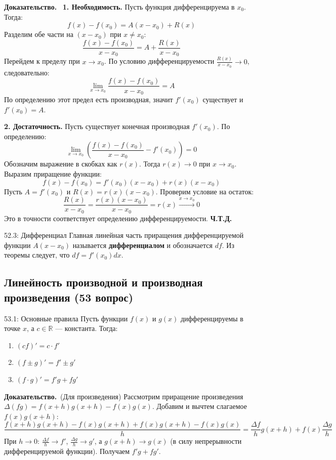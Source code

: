 \documentclass[a4paper,12pt]{article}
\newcommand{\myproof}{\textbf{Доказательство.}\ }
\begin{document}
	\vspace{0.5cm}
	\myproof
	\textbf{1. Необходимость.} Пусть функция дифференцируема в $x_0$. Тогда:
	$$ f(x) - f(x_0) = A(x - x_0) + R(x) $$
	Разделим обе части на $(x - x_0)$ при $x \neq x_0$:
	$$ \frac{f(x) - f(x_0)}{x - x_0} = A + \frac{R(x)}{x - x_0} $$
	Перейдем к пределу при $x \to x_0$. По условию дифференцируемости $\frac{R(x)}{x - x_0} \to 0$, следовательно:
	$$ \lim_{x \to x_0} \frac{f(x) - f(x_0)}{x - x_0} = A $$
	По определению этот предел есть производная, значит $f'(x_0)$ существует и $f'(x_0) = A$.
	
	\textbf{2. Достаточность.} Пусть существует конечная производная $f'(x_0)$. По определению:
	$$ \lim_{x \to x_0} \left( \frac{f(x) - f(x_0)}{x - x_0} - f'(x_0) \right) = 0 $$
	Обозначим выражение в скобках как $r(x)$. Тогда $r(x) \to 0$ при $x \to x_0$. Выразим приращение функции:
	$$ f(x) - f(x_0) = f'(x_0)(x - x_0) + r(x)(x - x_0) $$
	Пусть $A = f'(x_0)$ и $R(x) = r(x)(x - x_0)$. Проверим условие на остаток:
	$$ \frac{R(x)}{x - x_0} = \frac{r(x)(x - x_0)}{x - x_0} = r(x) \xrightarrow{x \to x_0} 0 $$
	Это в точности соответствует определению дифференцируемости. \textbf{Ч.Т.Д.}
	
	\vspace{0.5cm}
	\begin{notebook}{52.3: Дифференциал}
		Главная линейная часть приращения дифференцируемой функции $A(x-x_0)$ называется \textbf{дифференциалом} и обозначается $df$. Из теоремы следует, что $df = f'(x_0)dx$.
	\end{notebook}
	
	
	
	
	\newpage
	\subsection{Линейность производной и производная произведения (53 вопрос)}
	
	\begin{theorembox}{53.1: Основные правила}
		Пусть функции $f(x)$ и $g(x)$ дифференцируемы в точке $x$, а $c \in \mathbb{R}$ — константа. Тогда:
		\begin{enumerate}
			\item $(cf)' = c \cdot f'$
			\item $(f \pm g)' = f' \pm g'$
			\item $(f \cdot g)' = f'g + fg'$
		\end{enumerate}
	\end{theorembox}
	
	\myproof (Для произведения)
	Рассмотрим приращение произведения $\Delta(fg) = f(x+h)g(x+h) - f(x)g(x)$. 
	Добавим и вычтем слагаемое $f(x)g(x+h)$:
	$$ \frac{f(x+h)g(x+h) - f(x)g(x+h) + f(x)g(x+h) - f(x)g(x)}{h} = \frac{\Delta f}{h}g(x+h) + f(x)\frac{\Delta g}{h} $$
	При $h \to 0$: $\frac{\Delta f}{h} \to f'$, $\frac{\Delta g}{h} \to g'$, а $g(x+h) \to g(x)$ (в силу непрерывности дифференцируемой функции). Получаем $f'g + fg'$.
	
\end{document}

